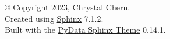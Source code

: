 © Copyright 2023, Chrystal Chern.\\

Created using \href{https://www.sphinx-doc.org/}{Sphinx} 7.1.2.\\

Built with the
\href{https://pydata-sphinx-theme.readthedocs.io/en/stable/index.html}{PyData
Sphinx Theme} 0.14.1.
